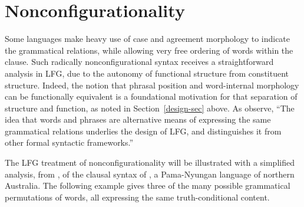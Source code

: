 %

\section{Nonconfigurationality}
\label{nonconfig-sec}
Some languages make heavy use of case and agreement morphology to indicate the grammatical relations, while allowing very free ordering of words within the clause.  Such radically nonconfigurational syntax receives a straightforward \pagebreak{}analysis in LFG, due to the autonomy of functional structure from constituent structure.  Indeed, the notion that phrasal position and word-internal morphology can be functionally equivalent is a foundational motivation for that separation of structure and function, as noted in Section~\ref{design-sec} above.  As \citet[5]{BATW2016a} observe, ``The idea that words and phrases are alternative means of expressing the
same grammatical relations underlies the design of LFG, and distinguishes it from other formal syntactic frameworks.''  

The LFG treatment of nonconfigurationality will be illustrated with a simplified analysis, from \citet[352--353]{BATW2016a}, of the clausal syntax of , a Pama-Nyungan language of northern Australia.  The following example gives three of the many possible grammatical permutations of words, all expressing the same truth-conditional content.

